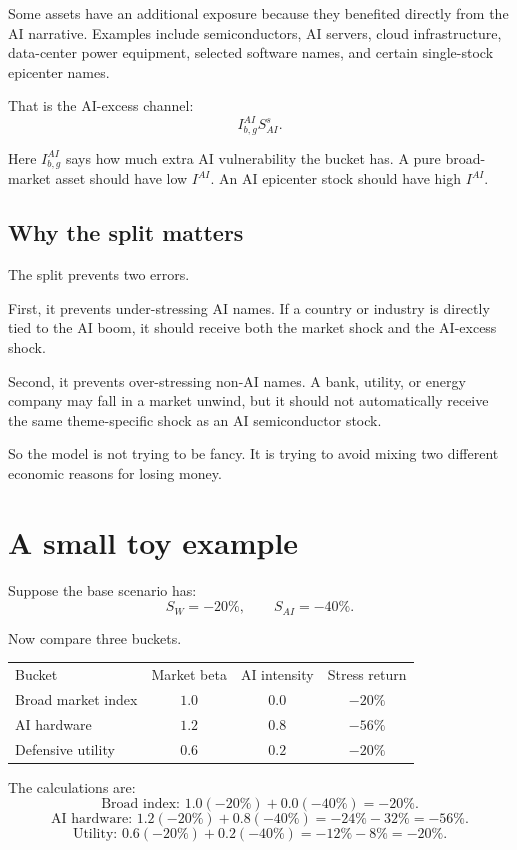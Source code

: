 \documentclass[10pt]{article}
\begin{document}
Some assets have an additional exposure because they benefited directly from the AI narrative. Examples include semiconductors, AI servers, cloud infrastructure, data-center power equipment, selected software names, and certain single-stock epicenter names.

That is the AI-excess channel:
\[
I_{b,g}^{AI}S_{AI}^s.
\]

Here $I_{b,g}^{AI}$ says how much extra AI vulnerability the bucket has. A pure broad-market asset should have low $I^{AI}$. An AI epicenter stock should have high $I^{AI}$.

\subsection{Why the split matters}

The split prevents two errors.

First, it prevents under-stressing AI names. If a country or industry is directly tied to the AI boom, it should receive both the market shock and the AI-excess shock.

Second, it prevents over-stressing non-AI names. A bank, utility, or energy company may fall in a market unwind, but it should not automatically receive the same theme-specific shock as an AI semiconductor stock.

So the model is not trying to be fancy. It is trying to avoid mixing two different economic reasons for losing money.

\section{A small toy example}

Suppose the base scenario has:
\[
S_W=-20\%, \qquad S_{AI}=-40\%.
\]

Now compare three buckets.

\begin{center}
\begin{tabular}{lccc}
Bucket & Market beta & AI intensity & Stress return \\
Broad market index & $1.0$ & $0.0$ & $-20\%$ \\
AI hardware & $1.2$ & $0.8$ & $-56\%$ \\
Defensive utility & $0.6$ & $0.2$ & $-20\%$
\end{tabular}
\end{center}

The calculations are:
\[
\mbox{Broad index: } 1.0(-20\%)+0.0(-40\%)=-20\%.
\]
\[
\mbox{AI hardware: } 1.2(-20\%)+0.8(-40\%)=-24\%-32\%=-56\%.
\]
\[
\mbox{Utility: } 0.6(-20\%)+0.2(-40\%)=-12\%-8\%=-20\%.
\]
\end{document}
